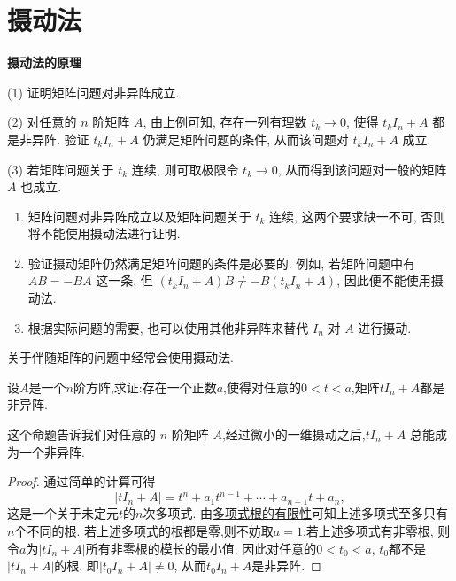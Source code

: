 \documentclass[../../main.tex]{subfiles}
\begin{document}
\section{摄动法}
\textbf{摄动法的原理}

(1) 证明矩阵问题对非异阵成立.

(2) 对任意的 \(n\) 阶矩阵 \(A\), 由上例可知, 存在一列有理数 \(t_k\rightarrow0\), 使得 \(t_kI_n + A\) 都是非异阵. 验证 \(t_kI_n + A\) 仍满足矩阵问题的条件, 从而该问题对 \(t_kI_n + A\) 成立.

(3) 若矩阵问题关于 \(t_k\) 连续, 则可取极限令 \(t_k\rightarrow0\), 从而得到该问题对一般的矩阵 \(A\) 也成立.

\begin{remark}
\begin{enumerate}
\item 矩阵问题对非异阵成立以及矩阵问题关于 \(t_k\) 连续, 这两个要求缺一不可, 否则将不能使用摄动法进行证明.
\item 验证摄动矩阵仍然满足矩阵问题的条件是必要的. 例如, 若矩阵问题中有 \(AB=-BA\) 这一条, 但 \((t_kI_n + A)B\neq -B(t_kI_n + A)\), 因此便不能使用摄动法.
\item 根据实际问题的需要, 也可以使用其他非异阵来替代 \(I_n\) 对 \(A\) 进行摄动.
\end{enumerate}
\end{remark}
\begin{note}
关于伴随矩阵的问题中经常会使用摄动法.
\end{note}


\begin{proposition}\label{proposition:摄动法基本命题}
设\(A\)是一个\(n\)阶方阵,求证:存在一个正数\(a\),使得对任意的\(0 < t < a\),矩阵\(tI_n+A\)都是非异阵. 
\end{proposition}
\begin{note}
这个命题告诉我们对任意的 \(n\) 阶矩阵 \(A\),经过微小的一维摄动之后,\(tI_n + A\) 总能成为一个非异阵.
\end{note}
\begin{proof}
通过简单的计算可得
\[
|tI_n + A| = t^n + a_1t^{n - 1}+\cdots+a_{n - 1}t + a_n,
\]
这是一个关于未定元\(t\)的\(n\)次多项式. 由\hyperref[proposition:多项式根的有限性]{多项式根的有限性}可知上述多项式至多只有\(n\)个不同的根. 若上述多项式的根都是零,则不妨取\(a = 1\);若上述多项式有非零根, 则令\(a\)为\(|tI_n + A|\)所有非零根的模长的最小值. 因此对任意的\(0 < t_0 < a\), \(t_0\)都不是\(|tI_n + A|\)的根, 即\(|t_0I_n + A|\neq0\), 从而\(t_0I_n + A\)是非异阵.
\end{proof}
\end{document}
